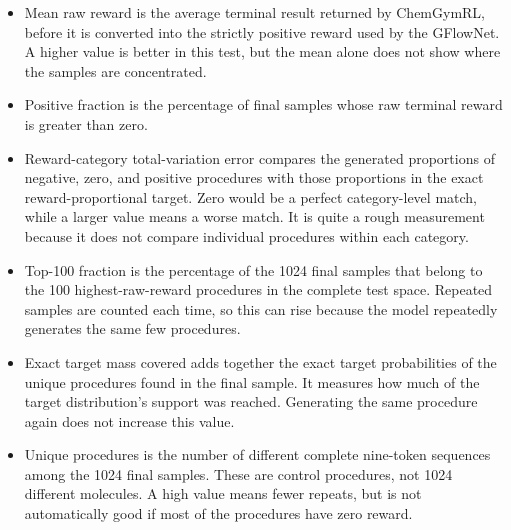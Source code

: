 \documentclass{article}
\begin{document}
\begin{itemize}
    \item Mean raw reward is the average terminal result returned by ChemGymRL, before it is converted into the strictly positive reward used by the GFlowNet. A higher value is better in this test, but the mean alone does not show where the samples are concentrated.
    \item Positive fraction is the percentage of final samples whose raw terminal reward is greater than zero.
    \item Reward-category total-variation error compares the generated proportions of negative, zero, and positive procedures with those proportions in the exact reward-proportional target. Zero would be a perfect category-level match, while a larger value means a worse match. It is quite a rough measurement because it does not compare individual procedures within each category.
    \item Top-100 fraction is the percentage of the 1024 final samples that belong to the 100 highest-raw-reward procedures in the complete test space. Repeated samples are counted each time, so this can rise because the model repeatedly generates the same few procedures.
    \item Exact target mass covered adds together the exact target probabilities of the unique procedures found in the final sample. It measures how much of the target distribution's support was reached. Generating the same procedure again does not increase this value.
    \item Unique procedures is the number of different complete nine-token sequences among the 1024 final samples. These are control procedures, not 1024 different molecules. A high value means fewer repeats, but is not automatically good if most of the procedures have zero reward.
\end{itemize}
\end{document}
